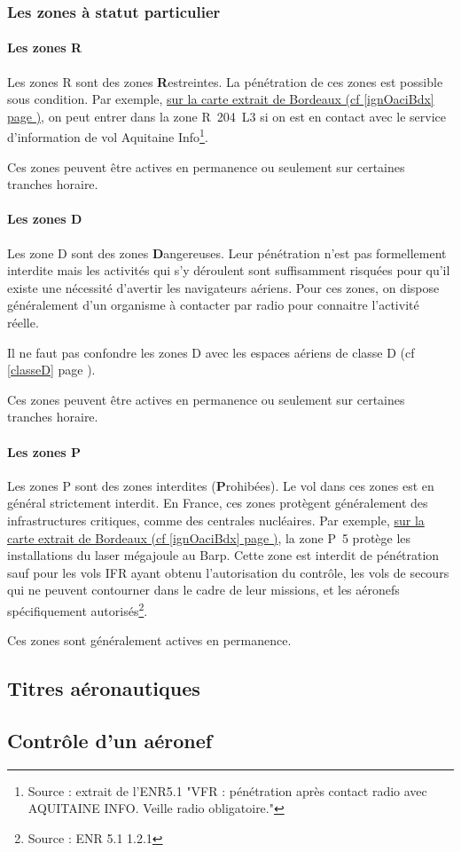 		\subsubsection{Les zones à statut particulier}
			\paragraph{Les zones R}
			Les zones R sont des zones \textbf{R}estreintes. La pénétration de ces zones est possible sous condition. Par exemple, \hyperlink{ignOaciBordeaux.1}{sur la carte extrait de Bordeaux (cf \ref{ignOaciBdx} page \pageref{ignOaciBdx})}, on peut entrer dans la zone R~204~L3 si on est en contact avec le service d'information de vol Aquitaine Info\footnote{Source : extrait de l'ENR5.1 "VFR : pénétration après contact radio avec AQUITAINE INFO. Veille radio obligatoire."}.
			
			Ces zones peuvent être actives en permanence ou seulement sur certaines tranches horaire.
			
			\paragraph{Les zones D}
			Les zone D sont des zones \textbf{D}angereuses. Leur pénétration n'est pas formellement interdite mais les activités qui s'y déroulent sont suffisamment risquées pour qu'il existe une nécessité d'avertir les navigateurs aériens. Pour ces zones, on dispose généralement d'un organisme à contacter par radio pour connaitre l'activité réelle.
			
			\alert{Il ne faut pas confondre les zones D avec les espaces aériens de classe D (cf \ref{classeD} page \pageref{classeD}).}
			
			Ces zones peuvent être actives en permanence ou seulement sur certaines tranches horaire.
			
			\paragraph{Les zones P}
			Les zones P sont des zones interdites (\textbf{P}rohibées). Le vol dans ces zones est en général strictement interdit. En France, ces zones protègent généralement des infrastructures critiques, comme des centrales nucléaires. Par exemple, \hyperlink{ignOaciBordeaux.1}{sur la carte extrait de Bordeaux (cf \ref{ignOaciBdx} page \pageref{ignOaciBdx})}, la zone P~5 protège les installations du laser mégajoule au Barp. Cette zone est interdit de pénétration sauf pour les vols IFR ayant obtenu l'autorisation du contrôle, les vols de secours qui ne peuvent contourner dans le cadre de leur missions, et les aéronefs spécifiquement autorisés\footnote{Source : ENR 5.1 1.2.1}.
			
			Ces zones sont généralement actives en permanence.
	
	\subsection{Titres aéronautiques}
	
	\subsection{Contrôle d'un aéronef}